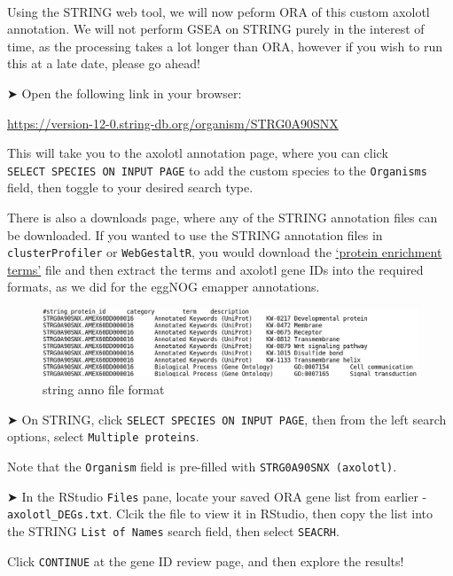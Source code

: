 \documentclass[
]{book}
\begin{document}
~

Using the STRING web tool, we will now peform ORA of this custom axolotl annotation. We will not perform GSEA on STRING purely in the interest of time, as the processing takes a lot longer than ORA, however if you wish to run this at a late date, please go ahead!

➤ Open the following link in your browser:

\url{https://version-12-0.string-db.org/organism/STRG0A90SNX}

This will take you to the axolotl annotation page, where you can click \texttt{SELECT\ SPECIES\ ON\ INPUT\ PAGE} to add the custom species to the \texttt{Organisms} field, then toggle to your desired search type.

There is also a downloads page, where any of the STRING annotation files can be downloaded. If you wanted to use the STRING annotation files in \texttt{clusterProfiler} or \texttt{WebGestaltR}, you would download the \href{https://stringdb-downloads.org/download_proteomes/protein.enrichment.terms.v12.0/STRG0A90SNX.protein.enrichment.terms.v12.0.txt.gz}{`protein enrichment terms'} file and then extract the terms and axolotl gene IDs into the required formats, as we did for the eggNOG emapper annotations.

\begin{figure}
\centering
\includegraphics{images/string-enrichment-file-format.png}
\caption{string anno file format}
\end{figure}

➤ On STRING, click \texttt{SELECT\ SPECIES\ ON\ INPUT\ PAGE}, then from the left search options, select \texttt{Multiple\ proteins}.

Note that the \texttt{Organism} field is pre-filled with \texttt{STRG0A90SNX\ (axolotl)}.

➤ In the RStudio \texttt{Files} pane, locate your saved ORA gene list from earlier - \texttt{axolotl\_DEGs.txt}. Clcik the file to view it in RStudio, then copy the list into the STRING \texttt{List\ of\ Names} search field, then select \texttt{SEACRH}.

Click \texttt{CONTINUE} at the gene ID review page, and then explore the results!
\end{document}
